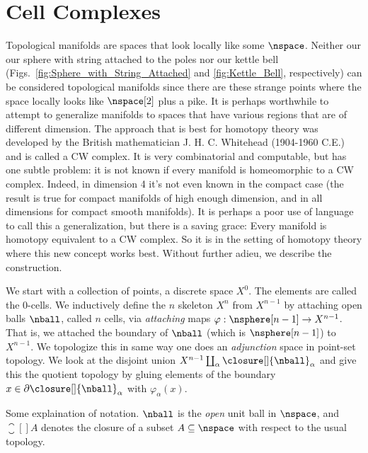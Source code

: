 \section{Cell Complexes}
    Topological manifolds are spaces that look locally like some
    $\nspace$. Neither our our sphere with string attached to the poles
    nor our kettle bell (Figs.~\ref{fig:Sphere_with_String_Attached} and
    \ref{fig:Kettle_Bell}, respectively) can be considered topological
    manifolds since there are these strange points where the space
    locally looks like $\nspace[2]$ plus a pike. It is perhaps
    worthwhile to attempt to generalize manifolds to spaces that have
    various regions that are of different dimension. The approach that
    is best for homotopy theory was developed by the British
    mathematician J. H. C. Whitehead (1904-1960 C.E.) and is called a
    CW complex. It is very combinatorial and computable, but has one
    subtle problem: it is not known if every manifold is homeomorphic to
    a CW complex. Indeed, in dimension 4 it's not even known in the
    compact case (the result is true for compact manifolds of high
    enough dimension, and in all dimensions for compact smooth
    manifolds). It is perhaps a poor use of language to call this
    a generalization, but there is a saving grace: Every manifold is
    homotopy equivalent to a CW complex. So it is in the setting of
    homotopy theory where this new concept works best. Without further
    adieu, we describe the construction.
    \par\hfill\par
    We start with a collection of points, a discrete space $X^{0}$. The
    elements are called the 0-cells. We inductively define the $n$
    skeleton $X^{n}$ from $X^{n-1}$ by attaching open balls $\nball$,
    called $n$ cells, via \textit{attaching} maps
    $\varphi:\nsphere[n-1]\rightarrow{X}^{n-1}$. That is, we attached
    the boundary of $\nball$ (which is $\nsphere[n-1]$) to $X^{n-1}$.
    We topologize this in same way one does an \textit{adjunction} space
    in point-set topology. We look at the disjoint union
    $X^{n-1}\coprod_{\alpha}\closure[]{\nball}_{\alpha}$ and give this
    the quotient topology by gluing elements of the boundary
    $x\in\partial\closure[]{\nball}_{\alpha}$ with
    $\varphi_{\alpha}(x)$.
    \par\hfill\par
    Some explaination of notation. $\nball$ is the \textit{open} unit
    ball in $\nspace$, and $\closure[]{A}$ denotes the closure of a
    subset $A\subseteq\nspace$ with respect to the usual topology.
